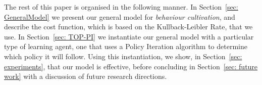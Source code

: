 
The rest of this paper is organised in the following manner. In
Section~\ref{sec: GeneralModel} we present our general model for
\emph{behaviour cultivation}, and describe the cost function, which is
based on the Kullback-Leibler Rate, that we use.  In Section~\ref{sec:
  TOP-PI} we instantiate our general model with a particular type of
learning agent, one that uses a Policy Iteration algorithm to
determine which policy it will follow. Using this instantiation, we
show, in Section~\ref{sec: experiments}, that our model is effective,
before concluding in Section~\ref{sec: future work} with a discussion
of future research directions.



